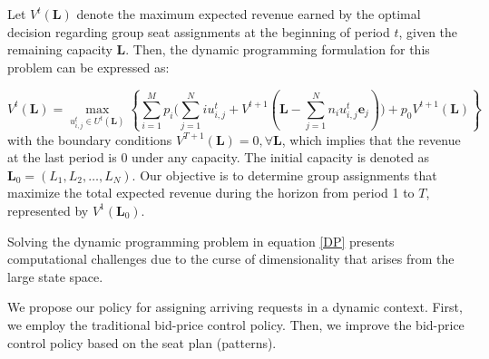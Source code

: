 Let $V^{t}(\mathbf{L})$ denote the maximum expected revenue earned by the optimal decision regarding group seat assignments at the beginning of period $t$, given the remaining capacity $\mathbf{L}$. Then, the dynamic programming formulation for this problem can be expressed as:

\begin{equation}\label{DP}
V^{t}(\mathbf{L}) = \max_{u_{i,j}^{t} \in U^{t}(\mathbf{L})}\left\{\sum_{i=1}^{M} p_i \bigl( \sum_{j=1}^{N} i u_{i,j}^{t} + V^{t+1}(\mathbf{L} - \sum_{j=1}^{N} n_i u_{i,j}^{t}\mathbf{e}_j)\bigr) + p_0 V^{t+1}(\mathbf{L})\right\}
\end{equation}
with the boundary conditions $V^{T+1}(\mathbf{L}) = 0, \forall \mathbf{L}$, which implies that the revenue at the last period is 0 under any capacity. The initial capacity is denoted as $\mathbf{L}_{0} = (L_1, L_2, \ldots, L_N)$. Our objective is to determine group assignments that maximize the total expected revenue during the horizon from period 1 to $T$, represented by $V^{1}(\mathbf{L}_{0})$.


Solving the dynamic programming problem in equation \eqref{DP} presents computational challenges due to the curse of dimensionality that arises from the large state space.

We propose our policy for assigning arriving requests in a dynamic context. First, we employ the traditional bid-price control policy. Then, we improve the bid-price control policy based on the seat plan (patterns).




